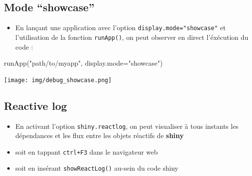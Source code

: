 \documentclass[
]{article}
\newenvironment{Shaded}{\begin{snugshade}}{\end{snugshade}}
\newcommand{\AttributeTok}[1]{\textcolor[rgb]{0.77,0.63,0.00}{#1}}
\newcommand{\CommentTok}[1]{\textcolor[rgb]{0.56,0.35,0.01}{\textit{#1}}}
\newcommand{\ConstantTok}[1]{\textcolor[rgb]{0.00,0.00,0.00}{#1}}
\newcommand{\FunctionTok}[1]{\textcolor[rgb]{0.00,0.00,0.00}{#1}}
\newcommand{\NormalTok}[1]{#1}
\newcommand{\OtherTok}[1]{\textcolor[rgb]{0.56,0.35,0.01}{#1}}
\newcommand{\SpecialCharTok}[1]{\textcolor[rgb]{0.00,0.00,0.00}{#1}}
\newcommand{\StringTok}[1]{\textcolor[rgb]{0.31,0.60,0.02}{#1}}
\providecommand{\tightlist}{%
  \setlength{\itemsep}{0pt}\setlength{\parskip}{0pt}}
\begin{document}
\hypertarget{mode-showcase}{%
\subsection{Mode ``showcase''}\label{mode-showcase}}

\begin{itemize}
\tightlist
\item
  En lançant une application avec l'option
  \texttt{display.mode="showcase"} et l'utilisation de la fonction
  \texttt{runApp()}, on peut observer en direct l'éxécution du code :
\end{itemize}

\begin{Shaded}
\begin{Highlighting}[]
\FunctionTok{runApp}\NormalTok{(}\StringTok{"path/to/myapp"}\NormalTok{, }\AttributeTok{display.mode=}\StringTok{"showcase"}\NormalTok{)}
\end{Highlighting}
\end{Shaded}

\texttt{[image: img/debug\_showcase.png]}

\hypertarget{reactive-log}{%
\subsection{Reactive log}\label{reactive-log}}

\begin{itemize}
\tightlist
\item
  En activant l'option \texttt{shiny.reactlog}, on peut visualiser à
  tous instants les dépendances et les flux entre les objets réactifs de
  \textbf{shiny}
\item
  soit en tappant \texttt{ctrl+F3} dans le navigateur web
\item
  soit en insérant \texttt{showReactLog()} au-sein du code shiny
\end{itemize}

\begin{Shaded}
\end{Shaded}
\end{document}
